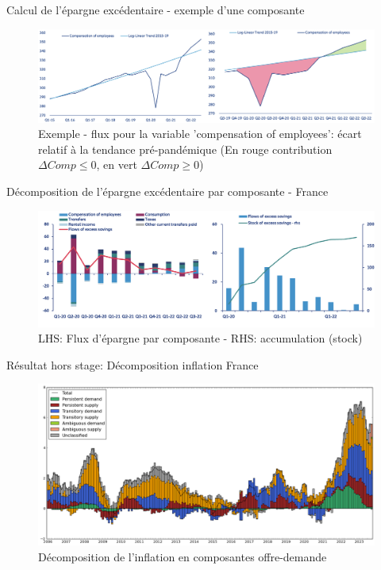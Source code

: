 \documentclass[9pt, xcolor={dvipsnames}]{beamer}
\begin{document}
\begin{frame}{Calcul de l'épargne excédentaire - exemple d'une composante}
  \begin{figure}
    \centering
    \includegraphics[width=1\textwidth]{img/excess_chart.png}
    \caption{Exemple - flux pour la variable 'compensation of employees': écart relatif à la tendance pré-pandémique (En rouge contribution $\Delta Comp \leq 0$, en vert $\Delta Comp \geq  0$)}
  \end{figure}
\end{frame}

\begin{frame}{Décomposition de l'épargne excédentaire par composante - France}
  \begin{figure}
    \centering
    \includegraphics[width=1\textwidth]{img/xFrance.png}
    \caption{LHS: Flux d'épargne par composante - RHS: accumulation (stock)}
  \end{figure}
\end{frame}

\begin{frame}{Résultat hors stage\footnotemark: Décomposition inflation France}
  \begin{figure}
    \centering
    \includegraphics[width=1\textwidth]{img/inflation_france.png}
    \caption{Décomposition de l'inflation en composantes offre-demande}
  \end{figure}
\end{frame}
\end{document}
